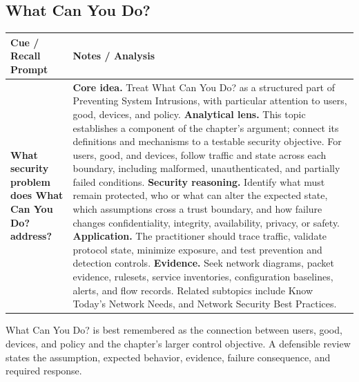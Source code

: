 \documentclass[11pt]{article}
\newcommand{\CornellHeader}{%
\rowcolor{Navy}\color{white}\bfseries Cue / Recall Prompt & \color{white}\bfseries Notes / Analysis\\\hline}
\newcommand{\CornellRow}[2]{%
\cellcolor{CueGray}\RaggedRight\textbf{#1} & \RaggedRight #2\\\hline}
\begin{document}
\subsection*{What Can You Do?}
\begin{longtable}{>{\RaggedRight\arraybackslash}p{}|>{\RaggedRight\arraybackslash}p{}}
\CornellHeader
\CornellRow{What security problem does What Can You Do? address?}{\textbf{Core idea.} Treat What Can You Do? as a structured part of Preventing System Intrusions, with particular attention to users, good, devices, and policy. \textbf{Analytical lens.} This topic establishes a component of the chapter's argument; connect its definitions and mechanisms to a testable security objective. For users, good, and devices, follow traffic and state across each boundary, including malformed, unauthenticated, and partially failed conditions. \textbf{Security reasoning.} Identify what must remain protected, who or what can alter the expected state, which assumptions cross a trust boundary, and how failure changes confidentiality, integrity, availability, privacy, or safety. \textbf{Application.} The practitioner should trace traffic, validate protocol state, minimize exposure, and test prevention and detection controls. \textbf{Evidence.} Seek network diagrams, packet evidence, rulesets, service inventories, configuration baselines, alerts, and flow records. Related subtopics include Know Today's Network Needs, and Network Security Best Practices.}
\end{longtable}
\begin{topicsummary}
What Can You Do? is best remembered as the connection between users, good, devices, and policy and the chapter's larger control objective. A defensible review states the assumption, expected behavior, evidence, failure consequence, and required response.
\end{topicsummary}
\end{document}
